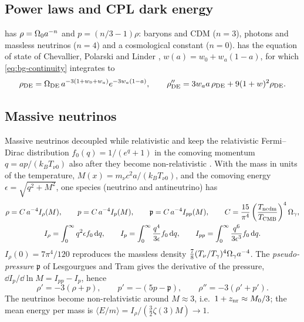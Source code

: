 \subsection{Power laws and CPL dark energy}

 has $\rho=\Omega_0a^{-n}$ and $p=(n/3-1)\rho$: baryons and CDM ($n=3$), photons and massless
neutrinos ($n=4$) and a cosmological constant ($n=0$).  has the equation of state of Chevallier,
Polarski and Linder \cite{ChevallierPolarski2001,Linder2003}, $w(a)=w_0+w_a(1-a)$, for which \cref{eq:bg-continuity}
integrates to
\begin{equation}
\rho_{\rm DE}=\Omega_{\rm DE}\,a^{-3(1+w_0+w_a)}e^{-3w_a(1-a)},\qquad
\rho_{\rm DE}''=3w_aa\,\rho_{\rm DE}+9(1+w)^2\rho_{\rm DE}.
\end{equation}

\subsection{Massive neutrinos}\label{sec:bg-ncdm}

Massive neutrinos decoupled while relativistic and keep the relativistic Fermi--Dirac distribution
$f_0(q)=1/(e^q+1)$ in the comoving momentum $q=ap/(k_BT_{\nu0})$ also after they become non-relativistic
\cite{LesgourguesPastor2006}. With the mass in units of the temperature, $M(x)=m_\nu c^2a/(k_BT_{\nu0})$, and the
comoving energy $\epsilon=\sqrt{q^2+M^2}$, one species (neutrino and antineutrino) has
\begin{gather}
\rho=C\,a^{-4}I_\rho(M),\qquad p=C\,a^{-4}I_p(M),\qquad \mathfrak p=C\,a^{-4}I_{pp}(M),\qquad
C=\frac{15}{\pi^4}\left(\frac{T_{\rm ncdm}}{T_{\rm CMB}}\right)^4\Omega_\gamma,\\
I_\rho=\int_0^\infty q^2\epsilon f_0\,\mathrm{d} q,\qquad I_p=\int_0^\infty\frac{q^4}{3\epsilon}f_0\,\mathrm{d} q,\qquad
I_{pp}=\int_0^\infty\frac{q^6}{3\epsilon^3}f_0\,\mathrm{d} q .
\end{gather}
$I_\rho(0)=7\pi^4/120$ reproduces the massless density $\frac78(T_\nu/T_\gamma)^4\Omega_\gamma a^{-4}$. The
\emph{pseudo-pressure} $\mathfrak p$ of Lesgourgues and Tram \cite{LesgourguesTram2011} gives the derivative of the
pressure, $\dd I_p/\dd\ln M=I_{pp}-I_p$, hence
\begin{equation}
\rho'=-3(\rho+p),\qquad p'=-(5p-\mathfrak p),\qquad \rho''=-3(\rho'+p').
\end{equation}
The neutrinos become non-relativistic around $M\approx3$, i.e.\ $1+z_{\rm nr}\approx M_0/3$; the mean energy per mass
is $\langle E/m\rangle=I_\rho/(\frac32\zeta(3)M)\to1$.

